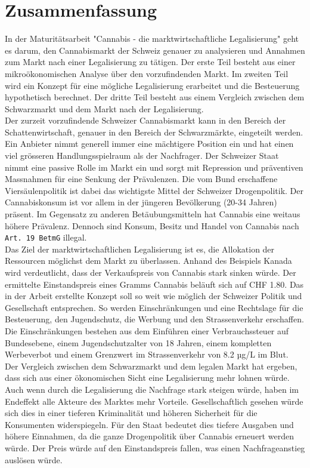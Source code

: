 \documentclass[../main.tex]{subfiles}
\begin{document}
	
	\section{Zusammenfassung}
	
	In der Maturitätsarbeit "Cannabis - die marktwirtschaftliche Legalisierung" geht es darum, den Cannabismarkt der Schweiz genauer zu analysieren und Annahmen zum Markt nach einer Legalisierung zu tätigen.
	Der erste Teil besteht aus einer mikroökonomischen Analyse über den vorzufindenden Markt.
	Im zweiten Teil wird ein Konzept für eine mögliche Legalisierung erarbeitet und die Besteuerung hypothetisch berechnet.
	Der dritte Teil besteht aus einem Vergleich zwischen dem Schwarzmarkt und dem Markt nach der Legalisierung.\\
	
	\noindent
	Der zurzeit vorzufindende Schweizer Cannabismarkt kann in den Bereich der Schattenwirtschaft, genauer in den Bereich der Schwarzmärkte, eingeteilt werden.
	Ein Anbieter nimmt generell immer eine mächtigere Position ein und hat einen viel grösseren Handlungsspielraum als der Nachfrager.
	Der Schweizer Staat nimmt eine passive Rolle im Markt ein und sorgt mit Repression und präventiven Massnahmen für eine Senkung der Prävalenzen.
	Die vom Bund erschaffene Viersäulenpolitik ist dabei das wichtigste Mittel der Schweizer Drogenpolitik.
	Der Cannabiskonsum ist vor allem in der jüngeren Bevölkerung (20-34 Jahren) präsent.
	Im Gegensatz zu anderen Betäubungsmitteln hat Cannabis eine weitaus höhere Prävalenz.
	Dennoch sind Konsum, Besitz und Handel von Cannabis nach \texttt{Art. 19 BetmG} illegal.\\
	
	\noindent
	Das Ziel der marktwirtschaftlichen Legalisierung ist es, die Allokation der Ressourcen möglichst dem Markt zu überlassen.
	Anhand des Beispiels Kanada wird verdeutlicht, dass der Verkaufspreis von Cannabis stark sinken würde.
	Der ermittelte Einstandspreis eines Gramms Cannabis beläuft sich auf CHF 1.80.
	Das in der Arbeit erstellte Konzept soll so weit wie möglich der Schweizer Politik und Gesellschaft entsprechen.
	So werden Einschränkungen und eine Rechtslage für die Besteuerung, den Jugendschutz, die Werbung und den Strassenverkehr erschaffen.
	Die Einschränkungen bestehen aus dem Einführen einer Verbrauchssteuer auf Bundesebene, einem Jugendschutzalter von 18 Jahren, einem kompletten Werbeverbot und einem Grenzwert im Strassenverkehr von 8.2 µg/L im Blut.\\
	
	\noindent	
	Der Vergleich zwischen dem Schwarzmarkt und dem legalen Markt hat ergeben, dass sich aus einer ökonomischen Sicht eine Legalisierung mehr lohnen würde.
	Auch wenn durch die Legalisierung die Nachfrage stark steigen würde, haben im Endeffekt alle Akteure des Marktes mehr Vorteile.
	Gesellschaftlich gesehen würde sich dies in einer tieferen Kriminalität und höheren Sicherheit für die Konsumenten widerspiegeln.
	Für den Staat bedeutet dies tiefere Ausgaben und höhere Einnahmen, da die ganze Drogenpolitik über Cannabis erneuert werden würde.
	Der Preis würde auf den Einstandspreis fallen, was einen Nachfrageanstieg auslösen würde.

	
	
\end{document}
